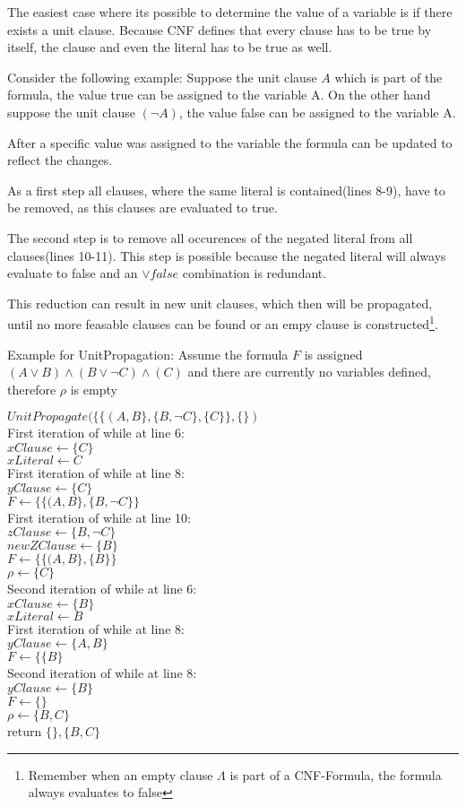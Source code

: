 The easiest case where its possible to determine the value of a variable is if there exists a unit clause. Because CNF defines that every clause has to be true by itself, the clause and even the literal has to be true as well.

Consider the following example: Suppose the unit clause $A$ which is part of the formula, the value true can be assigned to the variable A. On the other hand suppose the unit clause $(\lnot A)$, the value false can be assigned to the variable A.

After a specific value was assigned to the variable the formula can be updated to reflect the changes. 

As a first step all clauses, where the same literal is contained(lines 8-9), have to be removed, as this clauses are evaluated to true. 

The second step is to remove all occurences of the negated literal from all clauses(lines 10-11). This step is possible because the negated literal will always evaluate to false and an $\lor false$ combination is redundant.

This reduction can result in new unit clauses, which then will be propagated, until no more feasable clauses can be found or an empy clause is constructed\footnote{Remember when an empty clause $\Lambda$ is part of a CNF-Formula, the formula always evaluates to false}.

Example for UnitPropagation: 
Assume the formula $F$ is assigned $(A \lor B ) \land (B \lor \lnot C) \land (C)$ and there are currently no variables defined, therefore $\rho$ is empty

$UnitPropagate(\{\{(A,B\}, \{B, \lnot C\},\{C\}\}, \{\})$\\
First iteration of while at line 6: \\
$xClause \gets \{C\}$\\
$xLiteral \gets C$\\
First iteration of while at line 8:\\
$yClause \gets \{C\}$\\
$F \gets \{\{(A,B\}, \{B, \lnot C\}\}$\\
First iteration of while at line 10:\\
$zClause \gets \{B, \lnot C\}$ \\
$newZClause \gets \{B\}$\\
$F \gets \{\{(A,B\}, \{B\}\}$ \\
$\rho \gets \{C\}$\\
Second iteration of while at line 6: \\
$xClause \gets \{B\}$\\
$xLiteral \gets B$\\
First iteration of while at line 8:\\
$yClause \gets \{A,B\}$\\
$F \gets \{\{B\}$\\
Second iteration of while at line 8:\\
$yClause \gets \{B\}$\\
$F \gets \{\}$\\
$\rho \gets \{B, C\}$\\
return $\{\}, \{B, C\}$


